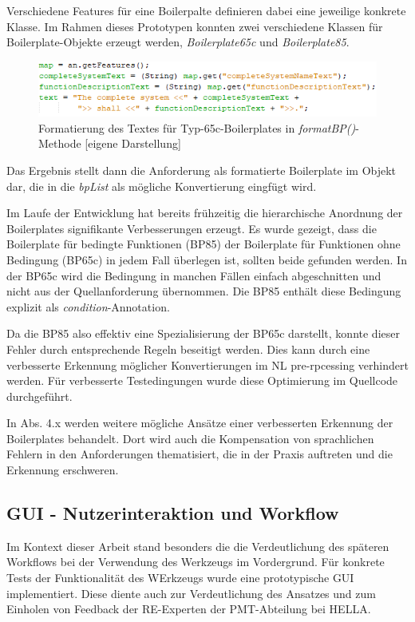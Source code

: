 \documentclass[12pt]{report}
\begin{document}
Verschiedene Features für eine Boilerpalte definieren dabei eine jeweilige konkrete Klasse. Im Rahmen dieses Prototypen konnten zwei verschiedene Klassen für Boilerplate-Objekte erzeugt werden, \textit{Boilerplate65c} und \textit{Boilerplate85}. 

\begin{figure}[h!]
\begin{center}
\includegraphics[scale=1]{Bilder/Boilerplate-formatBP.png}
\caption{Formatierung des Textes für Typ-65c-Boilerplates in \textit{formatBP()}-Methode [eigene Darstellung]}
\end{center}
\end{figure}

Das Ergebnis stellt dann die Anforderung als formatierte Boilerplate im Objekt dar, die in die \textit{bpList} als mögliche Konvertierung eingfügt wird.

\vspace{12pt}
Im Laufe der Entwicklung hat bereits frühzeitig die hierarchische Anordnung der Boilerplates signifikante Verbesserungen erzeugt. Es wurde gezeigt, dass die Boilerplate für bedingte Funktionen (BP85) der Boilerplate für Funktionen ohne Bedingung (BP65c) in jedem Fall überlegen ist, sollten beide gefunden werden. In der BP65c wird die Bedingung in manchen Fällen einfach abgeschnitten und nicht aus der Quellanforderung übernommen. Die BP85 enthält diese Bedingung explizit als \textit{condition}-Annotation. 

Da die BP85 also effektiv eine Spezialisierung der BP65c darstellt, konnte dieser Fehler durch entsprechende Regeln beseitigt werden. Dies kann durch eine verbesserte Erkennung möglicher Konvertierungen im NL pre-rpcessing verhindert werden. Für verbesserte Testedingungen wurde diese Optimierung im Quellcode durchgeführt.

In Abs. 4.x werden weitere mögliche Ansätze einer verbesserten Erkennung der Boilerplates behandelt. Dort wird auch die Kompensation von sprachlichen Fehlern in den Anforderungen thematisiert, die in der Praxis auftreten und die Erkennung erschweren.

\subsection{GUI - Nutzerinteraktion und Workflow}
Im Kontext dieser Arbeit stand besonders die die Verdeutlichung des späteren Workflows bei der Verwendung des Werkzeugs im Vordergrund. Für konkrete Tests der Funktionalität des WErkzeugs wurde eine prototypische GUI implementiert. Diese diente auch zur Verdeutlichung des Ansatzes und zum Einholen von Feedback der RE-Experten der PMT-Abteilung bei HELLA.
\end{document}
